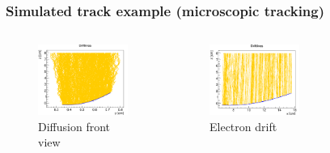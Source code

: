 \documentclass{beamer}
\begin{document}
	\begin{frame}
		\frametitle{Simulated track example (microscopic tracking)}		
		\begin{columns}
			\begin{figure}
				\centering
				\includegraphics[width = 0.95 \linewidth]{../images/drift_yz.png}
				\caption{Diffusion front view}
			\end{figure}
			\begin{figure}
				\centering
				\includegraphics[width = 0.95 \linewidth]{../images/drift_xz.png}
				\caption{Electron drift}
			\end{figure}
			\begin{figure}

\end{figure}
\end{columns}
\end{frame}
\end{document}
